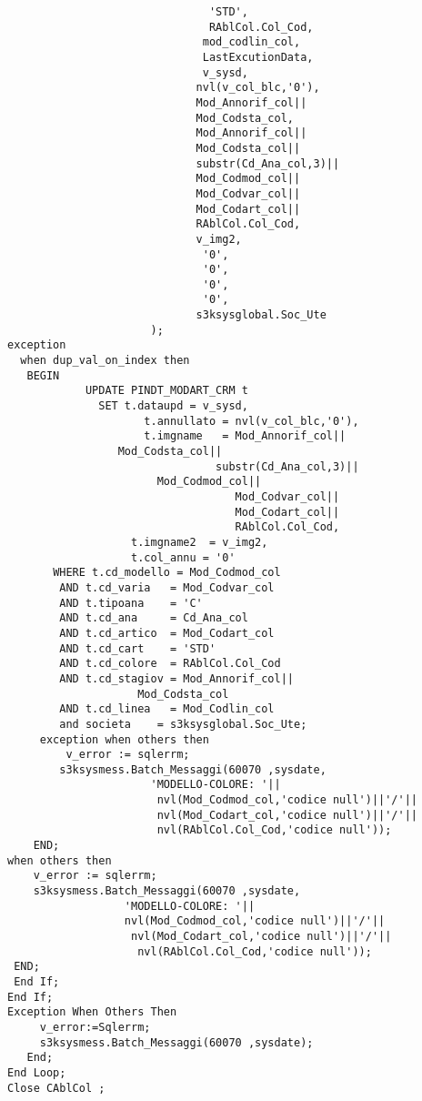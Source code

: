 \begin{lstlisting}
                               'STD',
                               RAblCol.Col_Cod,
                              mod_codlin_col,
                              LastExcutionData,
                              v_sysd,
                             nvl(v_col_blc,'0'),
                             Mod_Annorif_col||
                             Mod_Codsta_col,
                             Mod_Annorif_col||
                             Mod_Codsta_col||
                             substr(Cd_Ana_col,3)||
                             Mod_Codmod_col||
                             Mod_Codvar_col||
                             Mod_Codart_col||
                             RAblCol.Col_Cod,
                             v_img2,
                              '0',
                              '0',
                              '0',
                              '0',
                             s3ksysglobal.Soc_Ute
                      );
exception
  when dup_val_on_index then
   BEGIN
            UPDATE PINDT_MODART_CRM t 
              SET t.dataupd = v_sysd,
                     t.annullato = nvl(v_col_blc,'0'),
                     t.imgname   = Mod_Annorif_col||
				 Mod_Codsta_col||
                                substr(Cd_Ana_col,3)||
			           Mod_Codmod_col||
                                   Mod_Codvar_col||
                                   Mod_Codart_col||
                                   RAblCol.Col_Cod,
                   t.imgname2  = v_img2,
                   t.col_annu = '0'
       WHERE t.cd_modello = Mod_Codmod_col
        AND t.cd_varia   = Mod_Codvar_col
        AND t.tipoana    = 'C'
        AND t.cd_ana     = Cd_Ana_col
        AND t.cd_artico  = Mod_Codart_col
        AND t.cd_cart    = 'STD'
        AND t.cd_colore  = RAblCol.Col_Cod
        AND t.cd_stagiov = Mod_Annorif_col||
			        Mod_Codsta_col
        AND t.cd_linea   = Mod_Codlin_col 
        and societa    = s3ksysglobal.Soc_Ute;
     exception when others then
         v_error := sqlerrm;
        s3ksysmess.Batch_Messaggi(60070 ,sysdate,
	                  'MODELLO-COLORE: '||
                       nvl(Mod_Codmod_col,'codice null')||'/'||
                       nvl(Mod_Codart_col,'codice null')||'/'||
                       nvl(RAblCol.Col_Cod,'codice null'));
    END;
when others then
    v_error := sqlerrm;
    s3ksysmess.Batch_Messaggi(60070 ,sysdate,
                  'MODELLO-COLORE: '||
                  nvl(Mod_Codmod_col,'codice null')||'/'||
                   nvl(Mod_Codart_col,'codice null')||'/'||
                    nvl(RAblCol.Col_Cod,'codice null'));
 END;
 End If;
End If;
Exception When Others Then
     v_error:=Sqlerrm;
     s3ksysmess.Batch_Messaggi(60070 ,sysdate);
   End;
End Loop;
Close CAblCol ;
\end{lstlisting}


